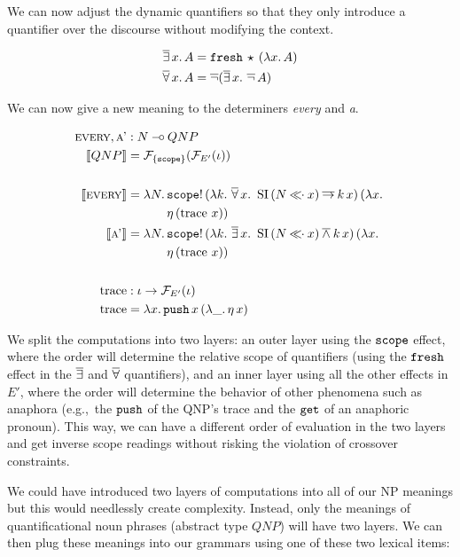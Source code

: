 We can now adjust the dynamic quantifiers so that they only introduce a
quantifier over the discourse without modifying the context.

\begin{align*}
  \mathop{\overline{\exists}} x.\,A &= \mathtt{fresh}\,\star\,(\lambda x.\, A) \\
  \mathop{\overline{\forall}} x.\,A &= \mathop{\overline{\lnot}} (\mathop{\overline{\exists}} x.\,\mathop{\overline{\lnot}} A)
\end{align*}

We can now give a new meaning to the determiners \emph{every} and \emph{a}.

\begin{align*}
  \textsc{every}, \textsc{a'} &: N \mathbin{{-}\mkern-3.5mu{\circ}} QNP \\
  \llbracket QNP \rrbracket &= \mathcal{F}_{\{\mathtt{scope}\}}(\mathcal{F}_{E'}(\iota)) \\
  \\
  \llbracket \textsc{every} \rrbracket &= \lambda N.\, \begin{aligned}[t]
      &\mathtt{scope}!\,(\lambda k.\, \mathop{\overline{\forall}} x.\ \operatorname{SI}\,(N \mathbin{\ll\!\!\cdot} x) \mathbin{\overline{\to}} k\,x)\,(\lambda x.\,  \\
      &\eta\,(\operatorname{trace}\,x))
    \end{aligned} \\
  \llbracket \textsc{a'} \rrbracket &= \lambda N.\, \begin{aligned}[t]
      &\mathtt{scope}!\,(\lambda k.\, \mathop{\overline{\exists}} x.\ \operatorname{SI}\,(N \mathbin{\ll\!\!\cdot} x) \mathbin{\overline{\land}} k\,x)\,(\lambda x.\,  \\
      &\eta\,(\operatorname{trace}\,x))
    \end{aligned} \\
  \\
  \operatorname{trace} &: \iota \to \mathcal{F}_{E'}(\iota) \\
  \operatorname{trace} &= \lambda x.\, \mathtt{push}\,x\,(\lambda \_.\, \eta\,x)
\end{align*}

We split the computations into two layers: an outer layer using the
$\mathtt{scope}$ effect, where the order will determine the relative scope of
quantifiers (using the $\mathtt{fresh}$ effect in the $\mathop{\overline{\exists}}$ and $\mathop{\overline{\forall}}$
quantifiers), and an inner layer using all the other effects in $E'$, where
the order will determine the behavior of other phenomena such as anaphora
(e.g.,\ the $\mathtt{push}$ of the QNP's trace and the $\mathtt{get}$ of an
anaphoric pronoun). This way, we can have a different order of evaluation
in the two layers and get inverse scope readings without risking the
violation of crossover constraints.

We could have introduced two layers of computations into all of our NP
meanings but this would needlessly create complexity. Instead, only the
meanings of quantificational noun phrases (abstract type $QNP$) will have
two layers. We can then plug these meanings into our grammars using one of
these two lexical items:

